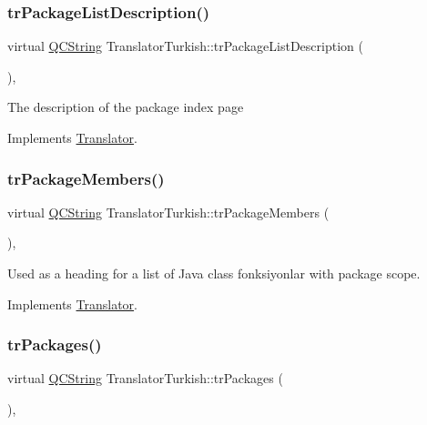 \subsubsection{\texorpdfstring{trPackageListDescription()}{trPackageListDescription()}}
{\footnotesize\ttfamily virtual \mbox{\hyperlink{class_q_c_string}{Q\+C\+String}} Translator\+Turkish\+::tr\+Package\+List\+Description (\begin{DoxyParamCaption}{ }\end{DoxyParamCaption})\hspace{0.3cm}{\ttfamily [inline]}, {\ttfamily [virtual]}}

The description of the package index page 

Implements \mbox{\hyperlink{class_translator}{Translator}}.

\mbox{\label{class_translator_turkish_aeb752892e20d35149766d7aa456ddcbd}} 
\subsubsection{\texorpdfstring{trPackageMembers()}{trPackageMembers()}}
{\footnotesize\ttfamily virtual \mbox{\hyperlink{class_q_c_string}{Q\+C\+String}} Translator\+Turkish\+::tr\+Package\+Members (\begin{DoxyParamCaption}{ }\end{DoxyParamCaption})\hspace{0.3cm}{\ttfamily [inline]}, {\ttfamily [virtual]}}

Used as a heading for a list of Java class fonksiyonlar with package scope. 

Implements \mbox{\hyperlink{class_translator}{Translator}}.

\mbox{\label{class_translator_turkish_ab55b242aa9158ebb863b206f06f8e2b8}} 
\subsubsection{\texorpdfstring{trPackages()}{trPackages()}}
{\footnotesize\ttfamily virtual \mbox{\hyperlink{class_q_c_string}{Q\+C\+String}} Translator\+Turkish\+::tr\+Packages (\begin{DoxyParamCaption}{ }\end{DoxyParamCaption})\hspace{0.3cm}{\ttfamily [inline]}, {\ttfamily [virtual]}}

